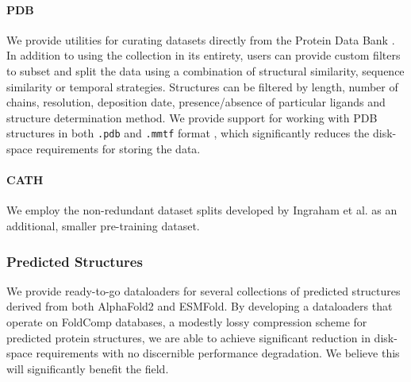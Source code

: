 \paragraph{PDB} We provide utilities for curating datasets directly from the Protein Data Bank \cite{Berman2000}. In addition to using the collection in its entirety, users can provide custom filters to subset and split the data using a combination of structural similarity, sequence similarity or temporal strategies. Structures can be filtered by length, number of chains, resolution, deposition date, presence/absence of particular ligands and structure determination method. We provide support for working with PDB structures in both \texttt{.pdb} and \texttt{.mmtf} format \cite{Bradley2017}, which significantly reduces the disk-space requirements for storing the data.


\paragraph{CATH} We employ the non-redundant dataset splits developed by Ingraham et al. as an additional, smaller pre-training dataset.




\subsubsection{Predicted Structures}
We provide ready-to-go dataloaders for several collections of predicted structures derived from both AlphaFold2 and ESMFold. By developing a dataloaders that operate on FoldComp databases, a modestly lossy compression scheme for predicted protein structures, we are able to achieve significant reduction in disk-space requirements with no discernible performance degradation. We believe this will significantly benefit the field.






